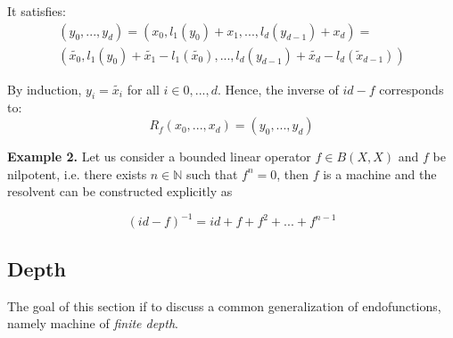 It satisfies:
\begin{align*}
    (y_0,...,y_d) = (x_0, l_1(y_0) + x_1, ..., l_d(y_{d-1}) + x_d) = \\(\widetilde{x_0}, l_1(y_0) + \widetilde{x_1} - l_1(\widetilde{x_0}),...,l_d(y_{d-1}) + \widetilde{x_d} - l_d(\widetilde{x}_{d-1}))
\end{align*}

By induction, $y_i = \widetilde{x_i}$ for all $i \in {0,...,d}$. Hence, the inverse of $id-f$ corresponds to:
\begin{equation*}
    R_f(x_0,...,x_d) = (y_0,...,y_d)
\end{equation*}

\textbf{Example 2.} Let us consider a bounded linear operator $f \in B(X,X)$ and $f$ be nilpotent, i.e. there exists $n \in \mathbb{N}$ such that $f^n = 0$, then $f$ is a machine and the resolvent can be constructed explicitly as

\begin{equation*}
    (id-f)^{-1} = id + f + f^2 + ... + f^{n-1}
\end{equation*}

\subsection{Depth}

The goal of this section if to discuss a common generalization of endofunctions, namely machine of \textit{finite depth}.
